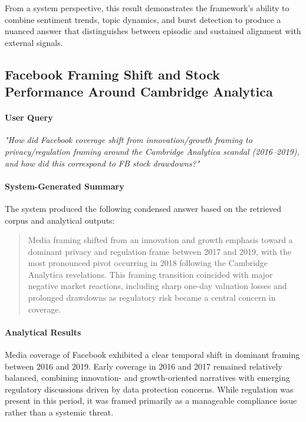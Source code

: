 From a system perspective, this result demonstrates the framework’s ability to combine sentiment trends, topic dynamics, and burst detection to produce a nuanced answer that distinguishes between episodic and sustained alignment with external signals.

\subsection{Facebook Framing Shift and Stock Performance Around Cambridge Analytica}

\paragraph{User Query}

\textit{"How did Facebook coverage shift from innovation/growth framing to privacy/regulation framing around the Cambridge Analytica scandal (2016–2019), and how did this correspond to FB stock drawdowns?"}

\paragraph{System-Generated Summary}
The system produced the following condensed answer based on the retrieved corpus and analytical outputs:

\begin{quote}
Media framing shifted from an innovation and growth emphasis toward a dominant privacy and regulation frame between 2017 and 2019, with the most pronounced pivot occurring in 2018 following the Cambridge Analytica revelations. This framing transition coincided with major negative market reactions, including sharp one-day valuation losses and prolonged drawdowns as regulatory risk became a central concern in coverage.
\end{quote}

\paragraph{Analytical Results}

Media coverage of Facebook exhibited a clear temporal shift in dominant framing between 2016 and 2019. Early coverage in 2016 and 2017 remained relatively balanced, combining innovation- and growth-oriented narratives with emerging regulatory discussions driven by data protection concerns. While regulation was present in this period, it was framed primarily as a manageable compliance issue rather than a systemic threat.

